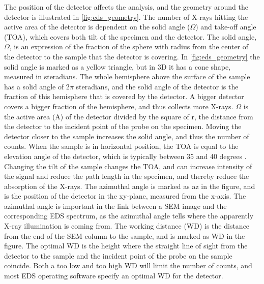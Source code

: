 The position of the detector affects the analysis, and the geometry around the detector is illustrated in \cref{fig:eds_geometry}.
The number of X-rays hitting the active area of the detector is dependent on the solid angle ($\Omega$) and take-off angle (TOA), which covers both tilt of the specimen and the detector.
The solid angle, $\Omega$, is an expression of the fraction of the sphere with radius from the center of the detector to the sample that the detector is covering.
In \cref{fig:eds_geometry} the solid angle is marked as a yellow triangle, but in 3D it has a cone shape, measured in steradians.
The whole hemisphere above the surface of the sample has a solid angle of 2$\pi$ steradians, and the solid angle of the detector is the fraction of this hemisphere that is covered by the detector.
A bigger detector covers a bigger fraction of the hemisphere, and thus collects more X-rays.
$\Omega$ is the active area (A) of the detector divided by the square of r, the distance from the detector to the incident point of the probe on the specimen.
Moving the detector closer to the sample increases the solid angle, and thus the number of counts.
When the sample is in horizontal position, the TOA is equal to the elevation angle of the detector, which is typically between 35 and 40 degrees \cite{dtsaii_1_getting_started}.
Changing the tilt of the sample changes the TOA, and can increase intensity of the signal and reduce the path length in the specimen, and thereby reduce the absorption of the X-rays.
The azimuthal angle is marked as az in the figure, and is the position of the detector in the xy-plane, measured from the x-axis.
The azimuthal angle is important in the link between a SEM image and the corresponding EDS spectrum, as the azimuthal angle tells where the apparently X-ray illumination is coming from.
The working distance (WD) is the distance from the end of the SEM column to the sample, and is marked as WD in the figure.
The optimal WD is the height where the straight line of sight from the detector to the sample and the incident point of the probe on the sample coincide.
Both a too low and too high WD will limit the number of counts, and most EDS operating software specify an optimal WD for the detector.




